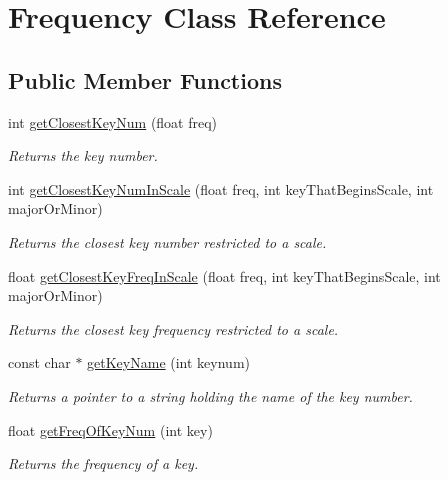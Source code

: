 \hypertarget{class_frequency}{}\section{Frequency Class Reference}
\label{class_frequency}
\subsection*{Public Member Functions}
\begin{DoxyCompactItemize}
\item 
int \hyperlink{class_frequency_a47545fddd4730f5ebebfb6f33bce8942}{get\+Closest\+Key\+Num} (float freq)
\begin{DoxyCompactList}\small\item\em Returns the key number. \end{DoxyCompactList}\item 
int \hyperlink{class_frequency_af927c6cee9c84e5acd26d8fdd78cc15b}{get\+Closest\+Key\+Num\+In\+Scale} (float freq, int key\+That\+Begins\+Scale, int major\+Or\+Minor)
\begin{DoxyCompactList}\small\item\em Returns the closest key number restricted to a scale. \end{DoxyCompactList}\item 
float \hyperlink{class_frequency_a003808da641b9c42e1775ee807124d3b}{get\+Closest\+Key\+Freq\+In\+Scale} (float freq, int key\+That\+Begins\+Scale, int major\+Or\+Minor)
\begin{DoxyCompactList}\small\item\em Returns the closest key frequency restricted to a scale. \end{DoxyCompactList}\item 
const char $\ast$ \hyperlink{class_frequency_aecd0a59f9b6a387090f31a3d12afb62a}{get\+Key\+Name} (int keynum)
\begin{DoxyCompactList}\small\item\em Returns a pointer to a string holding the name of the key number. \end{DoxyCompactList}\item 
float \hyperlink{class_frequency_ab1cbabec098dfffe96847b5c806dae98}{get\+Freq\+Of\+Key\+Num} (int key)
\begin{DoxyCompactList}\small\item\em Returns the frequency of a key. \end{DoxyCompactList}\end{DoxyCompactItemize}


